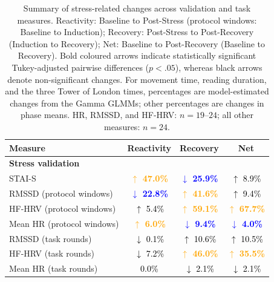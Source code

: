 \begin{table}[t]
\centering
\caption{Summary of stress-related changes across validation and task measures. Reactivity: Baseline to Post-Stress (protocol windows: Baseline to Induction); Recovery: Post-Stress to Post-Recovery (Induction to Recovery); Net: Baseline to Post-Recovery (Baseline to Recovery). Bold coloured arrows indicate statistically significant Tukey-adjusted pairwise differences ($p < .05$), whereas black arrows denote non-significant changes. For movement time, reading duration, and the three Tower of London times, percentages are model-estimated changes from the Gamma GLMMs; other percentages are changes in phase means. HR, RMSSD, and HF-HRV: $n=19$--$24$; all other measures: $n=24$.}
\label{tab:all-change-summary}
\begin{tabular}{lccc}
\toprule
\textbf{Measure} & \textbf{Reactivity} & \textbf{Recovery} & \textbf{Net} \\
\midrule
\multicolumn{4}{l}{\textbf{Stress validation}} \\
\quad STAI-S
& \textcolor{orange}{\textbf{\boldmath\(\uparrow\) 47.0\%}}
& \textcolor{blue}{\textbf{\boldmath\(\downarrow\) 25.9\%}}
& \textcolor{black}{\(\uparrow\) 8.9\%} \\
\quad RMSSD (protocol windows)
& \textcolor{blue}{\textbf{\boldmath\(\downarrow\) 22.8\%}}
& \textcolor{orange}{\textbf{\boldmath\(\uparrow\) 41.6\%}}
& \textcolor{black}{\(\uparrow\) 9.4\%} \\
\quad HF-HRV (protocol windows)
& \textcolor{black}{\(\uparrow\) 5.4\%}
& \textcolor{orange}{\textbf{\boldmath\(\uparrow\) 59.1\%}}
& \textcolor{orange}{\textbf{\boldmath\(\uparrow\) 67.7\%}} \\
\quad Mean HR (protocol windows)
& \textcolor{orange}{\textbf{\boldmath\(\uparrow\) 6.0\%}}
& \textcolor{blue}{\textbf{\boldmath\(\downarrow\) 9.4\%}}
& \textcolor{blue}{\textbf{\boldmath\(\downarrow\) 4.0\%}} \\
\quad RMSSD (task rounds)
& \textcolor{black}{\(\downarrow\) 0.1\%}
& \textcolor{black}{\(\uparrow\) 10.6\%}
& \textcolor{black}{\(\uparrow\) 10.5\%} \\
\quad HF-HRV (task rounds)
& \textcolor{black}{\(\downarrow\) 7.2\%}
& \textcolor{orange}{\textbf{\boldmath\(\uparrow\) 46.0\%}}
& \textcolor{orange}{\textbf{\boldmath\(\uparrow\) 35.5\%}} \\
\quad Mean HR (task rounds)
& \textcolor{black}{0.0\%}
& \textcolor{black}{\(\downarrow\) 2.1\%}
& \textcolor{black}{\(\downarrow\) 2.1\%} \\

\end{tabular}
\end{table}
